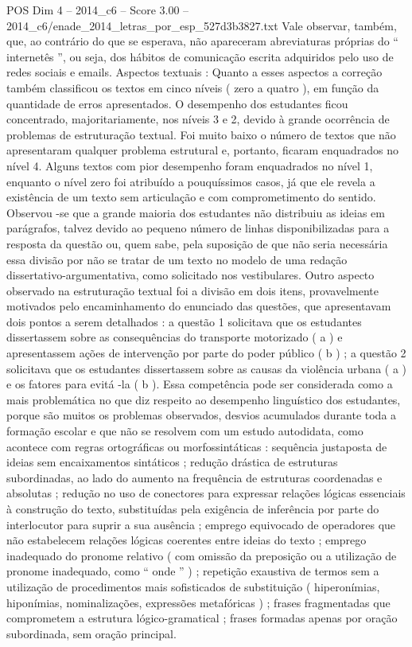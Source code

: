 \begin{textsample}{POS Dim 4 – 2014\_c6 – Score 3.00 – 2014\_c6/enade\_2014\_letras\_por\_esp\_527d3b3827.txt}
Vale observar, também, que, ao contrário do que se esperava, não apareceram abreviaturas próprias do “ internetês ”, ou seja, dos hábitos de comunicação escrita adquiridos pelo uso de redes sociais e emails.
Aspectos textuais : Quanto a esses aspectos a correção também classificou os textos em cinco níveis ( zero a quatro ), em função da quantidade de erros apresentados.
O desempenho dos estudantes ficou concentrado, majoritariamente, nos níveis 3 e 2, devido à grande ocorrência de problemas de estruturação textual.
Foi muito baixo o número de textos que não apresentaram qualquer problema estrutural e, portanto, ficaram enquadrados no nível 4.
Alguns textos com pior desempenho foram enquadrados no nível 1, enquanto o nível zero foi atribuído a pouquíssimos casos, já que ele revela a existência de um texto sem articulação e com comprometimento do sentido.
Observou -se que a grande maioria dos estudantes não distribuiu as ideias em parágrafos, talvez devido ao pequeno número de linhas disponibilizadas para a resposta da questão ou, quem sabe, pela suposição de que não seria necessária essa divisão por não se tratar de um texto no modelo de uma redação dissertativo-argumentativa, como solicitado nos vestibulares.
Outro aspecto observado na estruturação textual foi a divisão em dois itens, provavelmente motivados pelo encaminhamento do enunciado das questões, que apresentavam dois pontos a serem detalhados : a questão 1 solicitava que os estudantes dissertassem sobre as consequências do transporte motorizado ( a ) e apresentassem ações de intervenção por parte do poder público ( b ) ; a questão 2 solicitava que os estudantes dissertassem sobre as causas da violência urbana ( a ) e os fatores para evitá -la ( b ).
Essa competência pode ser considerada como a mais problemática no que diz respeito ao desempenho linguístico dos estudantes, porque são muitos os problemas observados, desvios acumulados durante toda a formação escolar e que não se resolvem com um estudo autodidata, como acontece com regras ortográficas ou morfossintáticas : sequência justaposta de ideias sem encaixamentos sintáticos ; redução drástica de estruturas subordinadas, ao lado do aumento na frequência de estruturas coordenadas e absolutas ; redução no uso de conectores para expressar relações lógicas essenciais à construção do texto, substituídas pela exigência de inferência por parte do interlocutor para suprir a sua ausência ; emprego equivocado de operadores que não estabelecem relações lógicas coerentes entre ideias do texto ; emprego inadequado do pronome relativo ( com omissão da preposição ou a utilização de pronome inadequado, como “ onde ” ) ; repetição exaustiva de termos sem a utilização de procedimentos mais sofisticados de substituição ( hiperonímias, hiponímias, nominalizações, expressões metafóricas ) ; frases fragmentadas que comprometem a estrutura lógico-gramatical ; frases formadas apenas por oração subordinada, sem oração principal.

\end{textsample}
